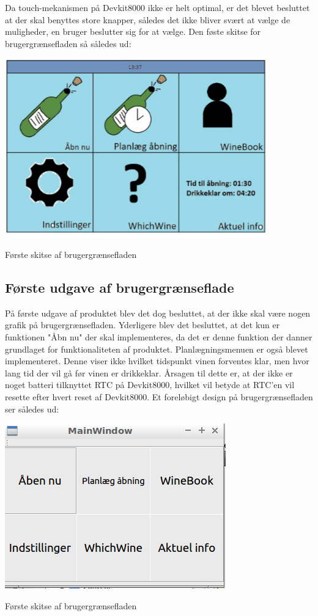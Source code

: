 Da touch-mekanismen på Devkit8000 ikke er helt optimal, er det blevet besluttet at der skal benyttes store knapper, således det ikke bliver svært at vælge de muligheder, en bruger beslutter sig for at vælge. Den føste skitse for brugergrænsefladen så således ud:

\includegraphics{Billeder/skitse}
\caption{Første skitse af brugergrænsefladen}

\subsection*{Første udgave af brugergrænseflade}
På første udgave af produktet blev det dog besluttet, at der ikke skal være nogen grafik på brugergrænsefladen. Yderligere blev det besluttet, at det kun er funktionen "Åbn nu" der skal implementeres, da det er denne funktion der danner grundlaget for funktionaliteten af produktet. Planlægningsmenuen er også blevet implementeret. Denne viser ikke hvilket tidspunkt vinen forventes klar, men hvor lang tid der vil gå før vinen er drikkeklar. Årsagen til dette er, at der ikke er noget batteri tilknyttet RTC på Devkit8000, hvilket vil betyde at RTC'en vil resette efter hvert reset af Devkit8000.
Et foreløbigt design på brugergrænsefladen ser således ud:

\includegraphics{Billeder/real_skitse}
\caption{Første skitse af brugergrænsefladen}

